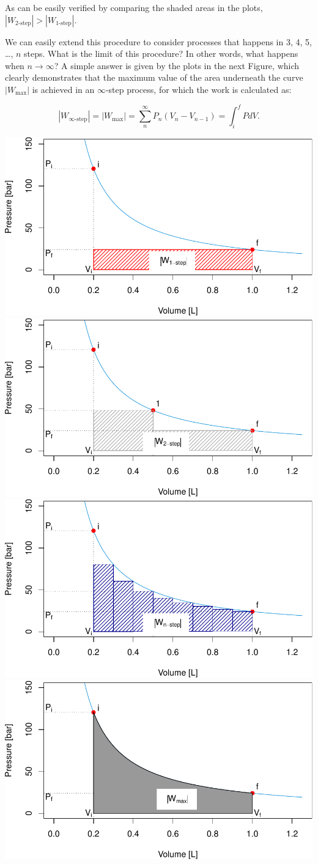 \documentclass[
  9pt,
]{extbook}
\theoremstyle{definition}
\theoremstyle{definition}
\theoremstyle{definition}
\theoremstyle{remark}
\begin{document}
As can be easily verified by comparing the shaded areas in the plots, \(\left| W_{\text{2-step}} \right| > \left| W_{\text{1-step}} \right|\).

We can easily extend this procedure to consider processes that happens in 3, 4, 5, \ldots, \(n\) steps. What is the limit of this procedure? In other words, what happens when \(n \rightarrow \infty\)? A simple answer is given by the plots in the next Figure, which clearly demonstrates that the maximum value of the area underneath the curve \(\left| W_{\text{max}}\right|\) is achieved in an \(\infty\)-step process, for which the work is calculated as:

\begin{equation}
  \left| W_{\infty \text{-step}} \right| = \left| W_{\text{max}} \right| = \sum_{n}^{\infty} P_n(V_n-V_{n-1}) = \int_{i}^{f} PdV.
  \label{eq:WintsolvedV2}
\end{equation}

\includegraphics[width=0.5\linewidth,height=1\textheight]{pchem1_files/figure-latex/figures-side-1} \includegraphics[width=0.5\linewidth,height=1\textheight]{pchem1_files/figure-latex/figures-side-2} \includegraphics[width=0.5\linewidth,height=1\textheight]{pchem1_files/figure-latex/figures-side-3} \includegraphics[width=0.5\linewidth,height=1\textheight]{pchem1_files/figure-latex/figures-side-4}
\end{document}
